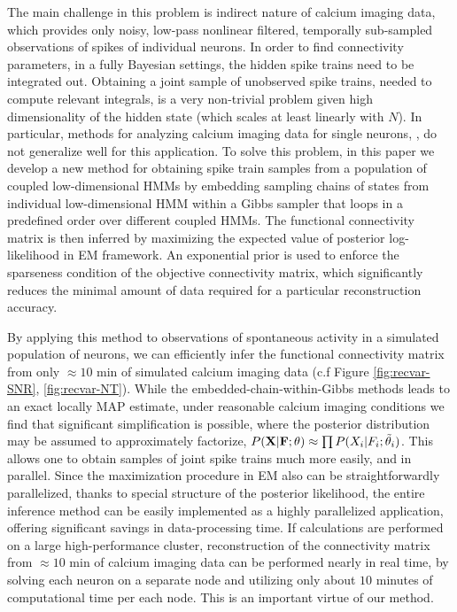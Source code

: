 \documentclass[aoas,preprint]{imsart}
\newcommand{\bF}{{\bf F}}
\newcommand{\bX}{{\bf X}}
\begin{document}
The main challenge in this problem is indirect nature of calcium imaging data, which provides only noisy, low-pass nonlinear filtered, temporally sub-sampled observations of spikes of individual neurons. In order to find connectivity parameters, in a fully Bayesian settings, the hidden spike trains need to be integrated out. Obtaining a joint sample of unobserved spike trains, needed to compute relevant integrals, is a very non-trivial problem given high dimensionality of the hidden state (which scales at least linearly with $N$). In particular, methods for analyzing calcium imaging data for single neurons, \cite{Vogelstein2009}, do not generalize well for this application. To solve this problem, in this paper we develop a new method for obtaining spike train samples from a population of coupled low-dimensional HMMs by embedding sampling chains of states from individual low-dimensional HMM within a Gibbs sampler that loops in a predefined order over different coupled HMMs. The functional connectivity matrix is then inferred by maximizing the expected value of posterior log-likelihood in EM framework. An exponential prior is used to enforce the sparseness condition of the objective connectivity matrix, which significantly reduces the minimal amount of data required for a particular reconstruction accuracy.

By applying this method to observations of spontaneous activity in a simulated population of neurons, we can efficiently infer the functional connectivity matrix from only $\approx 10$ min of simulated calcium imaging data (c.f Figure \ref{fig:recvar-SNR}, \ref{fig:recvar-NT}). While the embedded-chain-within-Gibbs methods leads to an exact locally MAP estimate, under reasonable calcium imaging conditions we find that significant simplification is possible, where the posterior distribution may be assumed to approximately factorize, $P(\bX|\bF;\theta)\approx \prod P(X_i|F_i;\tilde\theta_i)$. This allows one to obtain samples of joint spike trains much more easily, and in parallel. Since the maximization procedure in EM also can be straightforwardly parallelized, thanks to special structure of the posterior likelihood, the entire inference method can be easily implemented as a highly parallelized application, offering significant savings in data-processing time. If calculations are performed on a large high-performance cluster, reconstruction of the connectivity matrix from $\approx 10$ min of calcium imaging data can be performed nearly in real time, by solving each neuron on a separate node and utilizing only about $10$ minutes of computational time per each node. This is an important virtue of our method.
\end{document}

